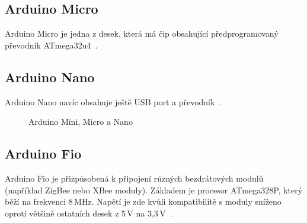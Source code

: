 	\subsection{Arduino Micro} 
	Arduino Micro je jedna z desek, která má čip obsahující předprogramovaný převodník ATmega32u4~\cite{ArduinoMicro}.	 
		
	\subsection{Arduino Nano} 
	Arduino Nano navíc obsahuje ještě USB port a převodník~\cite{ArduinoNano}.	
		
\begin{figure}[!ht]
	\vspace{-10pt}	
    \centering
			\hspace*{5mm}
			\hspace*{5mm}
		\caption{Arduino Mini, Micro a Nano}
		\vspace{-30pt}	
\end{figure}
	
		
		\subsection{Arduino Fio} 
		Arduino Fio je přizpůsobená k připojení různých bezdrátových modulů (například ZigBee nebo XBee moduly). Základem je procesor ATmega328P, který běží na frekvenci 8\,MHz. Napětí je zde kvůli kompatibilitě s moduly sníženo oproti většině ostatních desek z 5\,V na 3,3\,V~\cite{ArduinoFio}.	
		
